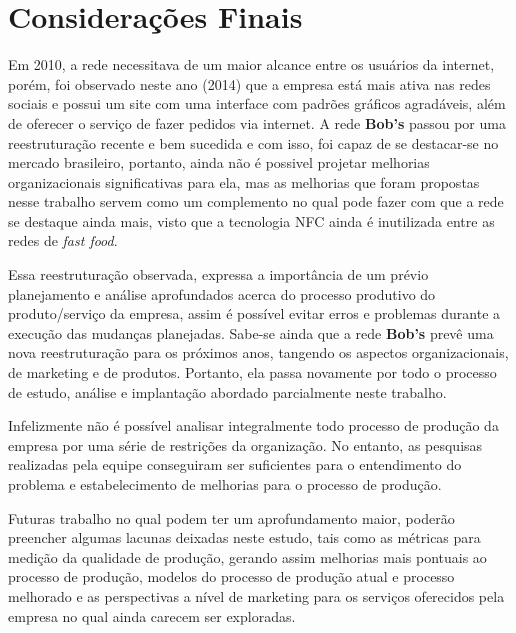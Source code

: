\chapter[Considerações Finais]{Considerações Finais}
\label{chap:consideracoes}
	
	Em 2010, a rede necessitava de um maior alcance entre os usuários da internet, porém, foi observado neste ano (2014) que a empresa está mais ativa nas redes sociais e possui um site com uma interface com padrões gráficos agradáveis, além de oferecer o serviço de fazer pedidos via internet. A rede \textbf{Bob's} passou por uma reestruturação recente e bem sucedida e com isso, foi capaz de se destacar-se no mercado brasileiro, portanto, ainda não é possivel projetar melhorias organizacionais significativas para ela, mas as melhorias que foram propostas nesse trabalho servem como um complemento no qual pode fazer com que a rede se destaque ainda mais, visto que a tecnologia NFC ainda é inutilizada entre as redes de \emph{fast food}.

	Essa reestruturação observada, expressa a importância de um prévio planejamento e análise aprofundados acerca do processo produtivo do produto/serviço da empresa, assim é possível evitar erros e problemas durante a execução das mudanças planejadas. Sabe-se ainda que a rede \textbf{Bob's} prevê uma nova reestruturação para os próximos anos, tangendo os aspectos organizacionais, de marketing e de produtos. Portanto, ela passa novamente por todo o processo de estudo, análise e implantação abordado parcialmente neste trabalho.

	Infelizmente não é possível analisar integralmente todo processo de produção da empresa por uma série de restrições da organização. No entanto, as pesquisas realizadas pela equipe conseguiram ser suficientes  para o entendimento do problema e estabelecimento de melhorias para o processo de produção.

	Futuras trabalho no qual podem ter um aprofundamento maior, poderão preencher algumas lacunas deixadas neste estudo, tais como as métricas para medição da qualidade de produção, gerando assim melhorias mais pontuais ao processo de produção, modelos do processo de produção atual e processo melhorado e as perspectivas a nível de marketing para os serviços oferecidos pela empresa no qual ainda carecem ser exploradas.


	